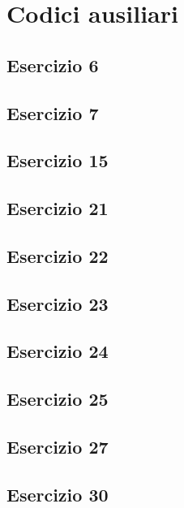 \section{Codici ausiliari}

\subsection{Esercizio 6}


\subsection{Esercizio 7}


\subsection{Esercizio 15}


\subsection{Esercizio 21}


\subsection{Esercizio 22}


\subsection{Esercizio 23}


\subsection{Esercizio 24}


\subsection{Esercizio 25}


\subsection{Esercizio 27}


\subsection{Esercizio 30}

